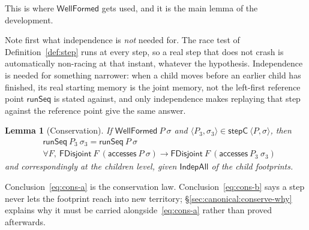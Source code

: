 \documentclass[11pt,a4paper]{article}
\theoremstyle{definition}
\theoremstyle{plain}
\newtheorem{lemma}[definition]{Lemma}
\theoremstyle{remark}
\newcommand{\st}{\sigma}
\newcommand{\acc}{\mathsf{accesses}}
\newcommand{\runSeq}{\mathsf{runSeq}}
\newcommand{\wf}{\mathsf{WellFormed}}
\begin{document}
This is where $\wf$ gets used, and it is the main lemma of the development.

Note first what independence is \emph{not} needed for. The race test of
Definition~\ref{def:step} runs at every step, so a real step that does not crash is
automatically non-racing at that instant, whatever the hypothesis. Independence is needed for
something narrower: when a child moves before an earlier child has finished, its real
starting memory is the joint memory, not the left-first reference point $\runSeq$ is stated
against, and only independence makes replaying that step against the reference point give the
same answer.

\begin{lemma}[Conservation]\label{lem:stepcombined}
If $\wf\ P\ \st$ and $\langle P_3, \st_3\rangle \in \mathsf{stepC}\ \langle P, \st\rangle$,
then
\begin{align}
  &\runSeq\ P_3\ \st_3 = \runSeq\ P\ \st \label{eq:cons-a}\\
  &\forall F,\ \mathsf{FDisjoint}\ F\ (\acc\ P\ \st) \to \mathsf{FDisjoint}\ F\ (\acc\ P_3\ \st_3) \label{eq:cons-b}
\end{align}
and correspondingly at the children level, given $\mathsf{IndepAll}$ of the child footprints.
\end{lemma}

Conclusion~\eqref{eq:cons-a} is the conservation law. Conclusion~\eqref{eq:cons-b} says a
step never lets the footprint reach into new territory; \S\ref{sec:canonical:conserve-why}
explains why it must be carried alongside~\eqref{eq:cons-a} rather than proved afterwards.
\end{document}
